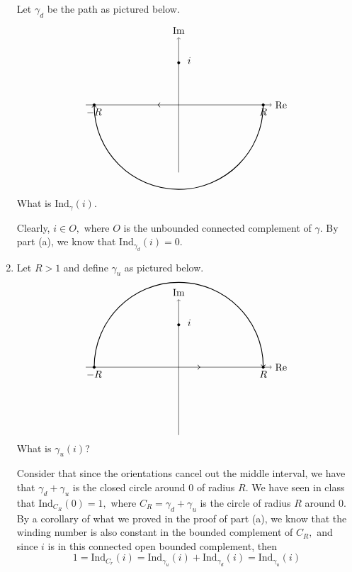 \documentclass[11pt]{article}
\newcommand{\Ind}{\text{Ind}}
\begin{document}
\begin{enumerate}
\begin{problem}
Let $\gamma_{d}$ be the path as pictured below. 
\[
    \begin{tikzpicture}[scale=1.5]
    \draw[->] (-2.2,0) -- (2.2,0) node[right] {$\Re$};
    \draw[->] (0,-1.6) -- (0,1.6) node[above] {$\Im$};

    \filldraw (-2,0) circle (0.03) node[below] {$-R$};
    \filldraw (2,0) circle (0.03) node[below] {$R$};

    \draw[thick,->] (2,0) arc (0:-180:2);
    
    \draw[thick,<-] (-0.5,0) -- (-0.49,0);

    \filldraw (0,1) circle (0.03);
    \node at (0.25,1.05) {$i$};

\end{tikzpicture}
\]
What is $\Ind_\gamma(i).$
\end{problem}
\begin{solution}
    Clearly, $i \in O,$ where $O$ is the unbounded connected complement of $\gamma.$ By part (a), we know that $\Ind_{\gamma_d}(i) = 0.$
\end{solution}
\item 
\begin{problem}
Let $R>1$ and define $\gamma_u$ as pictured below. 
\[
\begin{tikzpicture}[scale=1.5]
    \draw[->] (-2.2,0) -- (2.2,0) node[right] {$\Re$};
    \draw[->] (0,-1.6) -- (0,1.6) node[above] {$\Im$};

    \filldraw (-2,0) circle (0.03) node[below] {$-R$};
    \filldraw (2,0) circle (0.03) node[below] {$R$};

    \draw[thick,->] (-2,0) arc (180:0:2);

    \draw[thick,->] (0.5,0) -- (0.51,0);

    \filldraw (0,1) circle (0.03);
    \node at (0.25,1.05) {$i$};

\end{tikzpicture}\]
What is $\gamma_u(i)$?
\end{problem}
\begin{solution}
    Consider that since the orientations cancel out the middle interval, we have that $\gamma_d + \gamma_u$ is the closed circle around $0$ of radius $R.$ We have seen in class that $\Ind_{C_R}(0) = 1,$ where $C_R = \gamma_d + \gamma_u$ is the circle of radius $R$ around $0.$ By a corollary of what we proved in the proof of part (a), we know that the winding number is also constant in the bounded complement of $C_R,$ and since $i$ is in this connected open bounded complement, then 
    \[1 = \Ind_{C_r}(i) = \Ind_{\gamma_u}(i) + \Ind_{\gamma_d}(i) = \Ind_{\gamma_u}(i)\]
\end{solution}

\end{enumerate}
\end{document}

